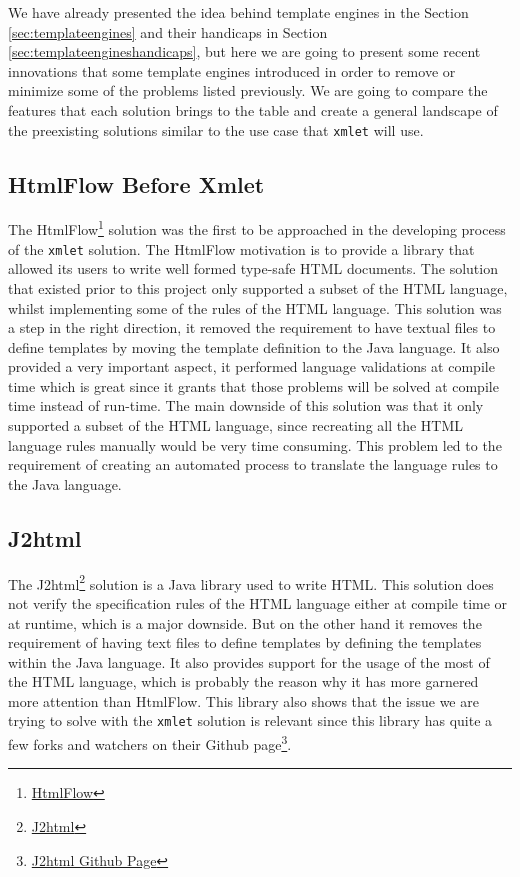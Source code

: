 We have already presented the idea behind template engines in the Section \ref{sec:templateengines} and their handicaps in Section  \ref{sec:templateengineshandicaps}, but here we are going to present some recent innovations that some template engines introduced in order to remove or minimize some of the problems listed previously. We are going to compare the features that each solution brings to the table and create a general landscape of the preexisting solutions similar to the use case that \texttt{xmlet} will use.

\subsection{HtmlFlow Before Xmlet}
\label{sec:htmlflowbeforexmlet}

The HtmlFlow\footnote{\href{https://github.com/xmlet/HtmlFlow}{HtmlFlow}} solution was the first to be approached in the developing process of the \texttt{xmlet} solution. The HtmlFlow motivation is to provide a library that allowed its users to write well formed type-safe \ac{HTML} documents. The solution that existed prior to this project only supported a subset of the \ac{HTML} language, whilst implementing some of the rules of the \ac{HTML} language. This solution was a step in the right direction, it removed the requirement to have textual files to define templates by moving the template definition to the Java language. It also provided a very important aspect, it performed language validations at compile time which is great since it grants that those problems will be solved at compile time instead of run-time. The main downside of this solution was that it only supported a subset of the \ac{HTML} language, since recreating all the \ac{HTML} language rules manually would be very time consuming. This problem led to the requirement of creating an automated process to translate the language rules to the Java language.

\subsection{J2html} %
\label{sec:j2html}

The J2html\footnote{\href{https://j2html.com/}{J2html}} solution is a Java library used to write \ac{HTML}. This solution does not verify the specification rules of the \ac{HTML} language either at compile time or at runtime, which is a major downside. But on the other hand it removes the requirement of having text files to define templates by defining the templates within the Java language. It also provides support for the usage of the most of the \ac{HTML} language, which is probably the reason why it has more garnered more attention than HtmlFlow. This library also shows that the issue we are trying to solve with the \texttt{xmlet} solution is relevant since this library has quite a few forks and watchers on their Github page\footnote{\href{https://github.com/tipsy/j2html}{J2html Github Page}}. 

